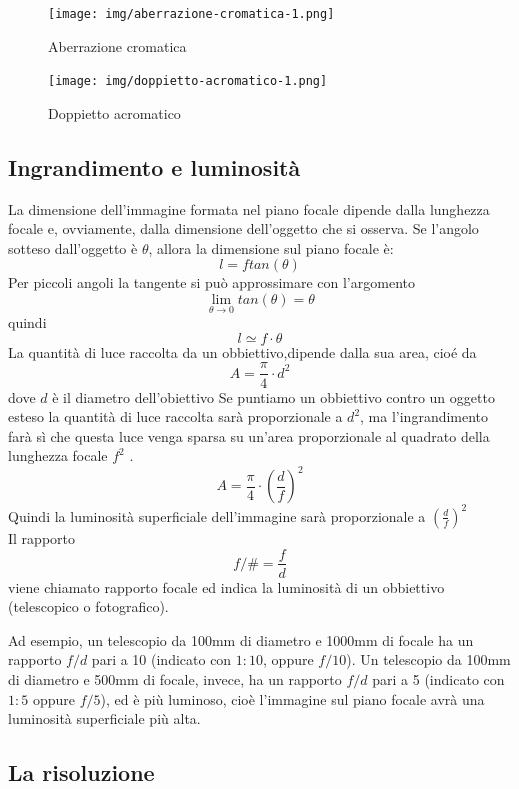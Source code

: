 \begin{figure}

\centering
\texttt{[image: img/aberrazione-cromatica-1.png]}

\caption{Aberrazione cromatica}
\label{fig:aberrazione-cromatica}
\end{figure}


\begin{figure}

\centering
\texttt{[image: img/doppietto-acromatico-1.png]}

\caption{Doppietto acromatico}
\label{fig:doppietto-acromatico}
\end{figure}

\subsection{Ingrandimento e luminosità}

La dimensione dell'immagine formata nel piano focale dipende dalla lunghezza
focale e, ovviamente, dalla dimensione dell'oggetto che si osserva. Se
l'angolo sotteso dall'oggetto è $\theta$, allora la dimensione sul piano
focale è: 
\[l = f tan(\theta)\]
Per piccoli angoli la tangente si può approssimare con l'argomento
\[\lim_{\theta \to 0} tan(\theta) = \theta \]
quindi 
\[l \simeq f \cdot \theta\]
La quantità di luce raccolta da un obbiettivo,dipende dalla sua area, cioé da 
\[A=\frac{\pi}{4} \cdot d^2\]
dove $d$ è il diametro dell'obiettivo
Se puntiamo un obbiettivo contro un oggetto esteso la quantità di luce raccolta sarà proporzionale a $d^2$,
ma l'ingrandimento farà sì che questa luce venga sparsa su un'area proporzionale al quadrato della lunghezza focale $f^2$ .
\[A=\frac{\pi}{4} \cdot \left(\frac{d}{f}\right)^2 \]
Quindi la luminosità superficiale dell'immagine sarà proporzionale a $\left(\frac{d}{f}\right)^2 $
\\
Il rapporto 
\[ f/\# = \frac{f}{d} \] 
viene chiamato rapporto focale ed indica la luminosità di un obbiettivo (telescopico o fotografico).

Ad esempio, un telescopio da 100\unit{mm} di diametro e 1000\unit{mm} di focale ha un rapporto $f/d$ pari a 10 (indicato con
$1:10$, oppure $f/10$). Un telescopio da 100\unit{mm} di diametro e 500\unit{mm} di focale, invece, ha un rapporto
$f/d$  pari a 5 (indicato con $1:5$ oppure $f/5$), ed è più luminoso, cioè l'immagine sul piano focale avrà
una luminosità superficiale più alta.

\subsection{La risoluzione}